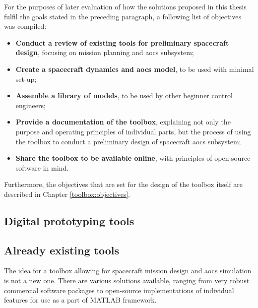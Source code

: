     For the purposes of later evaluation of how the solutions proposed in this thesis fulfil the goals stated in the preceding paragraph, a following list of objectives was compiled:

    \begin{itemize}
        \item \textbf{Conduct a review of existing tools for preliminary spacecraft design}, focusing on mission planning and \ac{aocs} subsystem;
        \item \textbf{Create a spacecraft dynamics and \ac{aocs} model}, to be used with minimal set-up;
        \item \textbf{Assemble a library of models}, to be used by other beginner control engineers;
        \item \textbf{Provide a documentation of the toolbox}, explaining not only the purpose and  operating principles of individual parts, but the process of using the toolbox to conduct a preliminary design of spacecraft \ac{aocs} subsystem;
        \item \textbf{Share the toolbox to be available online}, with principles of open-source software in mind.
    \end{itemize}

    Furthermore, the objectives that are set for the design of the toolbox itself are described in Chapter \ref{toolbox:objectives}.

\subsection{Digital prototyping tools}

\subsection{Already existing tools}

    The idea for a toolbox allowing for spacecraft mission design and \ac{aocs} simulation is not a new one. There are various solutions available, ranging from very robust commercial software packages to open-source implementations of individual features for use as a part of MATLAB framework.

